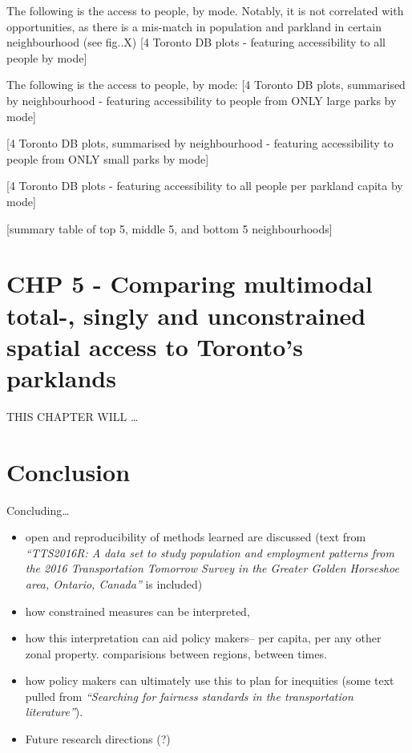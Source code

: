 \documentclass[
11pt, %
oneside, %
english, %
singlespacing, %
]{macthesis} %
\def\tightlist{}
\begin{document}
The following is the access to people, by mode. Notably, it is not correlated with opportunities, as there is a mis-match in population and parkland in certain neighbourhood (see fig..X)
{[}4 Toronto DB plots - featuring accessibility to all people by mode{]}

The following is the access to people, by mode:
{[}4 Toronto DB plots, summarised by neighbourhood - featuring accessibility to people from ONLY large parks by mode{]}

{[}4 Toronto DB plots, summarised by neighbourhood - featuring accessibility to people from ONLY small parks by mode{]}

{[}4 Toronto DB plots - featuring accessibility to all people per parkland capita by mode{]}

{[}summary table of top 5, middle 5, and bottom 5 neighbourhoods{]}

\chapter{CHP 5 - Comparing multimodal total-, singly and unconstrained spatial access to Toronto's parklands}\label{chp-5---comparing-multimodal-total--singly-and-unconstrained-spatial-access-to-torontos-parklands}

THIS CHAPTER WILL \ldots{}

\chapter*{Conclusion}\label{conclusion}

Concluding\ldots{}

\begin{itemize}
\tightlist
\item
  open and reproducibility of methods learned are discussed (text from \emph{``TTS2016R: A data set to study population and employment patterns from the 2016 Transportation Tomorrow Survey in the Greater Golden Horseshoe area, Ontario, Canada''} is included)
\item
  how constrained measures can be interpreted,
\item
  how this interpretation can aid policy makers-- per capita, per any other zonal property. comparisions between regions, between times.
\item
  how policy makers can ultimately use this to plan for inequities (some text pulled from \emph{``Searching for fairness standards in the transportation literature''}).
\item
  Future research directions (?)
\end{itemize}
\end{document}

